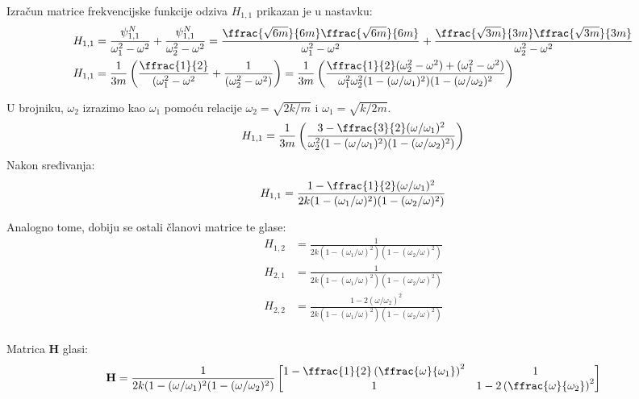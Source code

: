 Izračun matrice frekvencijske funkcije odziva $H_{1,1}$ prikazan je u nastavku:
\[
\begin{aligned}
    H_{1,1} &=
    \frac{\psi^N_{1,1}}{\omega_1^2-\omega^2}+\frac{\psi^N_{1,1}}{\omega_2^2-\omega^2}
    =
    \frac{\ffrac{\sqrt{6m}}{6m}\ffrac{\sqrt{6m}}{6m}}{\omega_1^2-\omega^2}
    +
    \frac{\ffrac{\sqrt{3m}}{3m}\ffrac{\sqrt{3m}}{3m}}{\omega_2^2-\omega^2}\\
    H_{1,1} &=
    \frac{1}{3m} 
        \left(
            \frac{\ffrac{1}{2}}{(\omega_1^2-\omega^2}
            +
            \frac{1}{(\omega_2^2-\omega^2)}
        \right)
    =
    \frac{1}{3m}
        \left(
            \frac{\ffrac{1}{2}(\omega_2^2-\omega^2)+(\omega_1^2-\omega^2)}
                {\omega_1^2\omega_2^2(1-(\omega/\omega_1)^2)(1-(\omega/\omega_2)^2}
        \right)\\
\end{aligned}
\]

U brojniku, $\omega_2$ izrazimo kao $\omega_1$ pomoću relacije $\omega_2=\sqrt{2k/m}$
i $\omega_1=\sqrt{k/2m}$.
\[
    \begin{aligned}
        H_{1,1}=
        \frac{1}{3m}
            \left(
                \frac{3-\ffrac{3}{2}(\omega/\omega_1)^2}
                    {\omega_2^2(1-(\omega/\omega_1)^2)(1-(\omega/\omega_2)^2)}
            \right)
    \end{aligned}
\]
Nakon sređivanja:
\begin{equation}\label{eq:frf_11}
    H_{1,1}=\frac{1-\ffrac{1}{2}(\omega/\omega_1)^2}{2k(1-(\omega_1/\omega)^2)(1-(\omega_2/\omega)^2)}
\end{equation}

Analogno tome, dobiju se ostali članovi matrice te glase:
\begin{align}
    H_{1,2} &= \frac{1}{2k(1-(\omega_1/\omega)^2)(1-(\omega_2/\omega)^2)}\label{eq:frf_12}\\
    H_{2,1} &= \frac{1}{2k(1-(\omega_1/\omega)^2)(1-(\omega_2/\omega)^2)}\label{eq:frf_21}\\
    H_{2,2} &= \frac{1-2(\omega/\omega_2)^2}{2k(1-(\omega_1/\omega)^2)(1-(\omega_2/\omega)^2)}\label{eq:frf_22}\\
\end{align}

Matrica $\mathbf{H}$ glasi:
\begin{equation}\label{eq:matrica_frf}
    \mathbf{H}=\frac{1}{2k(1-(\omega/\omega_1)^2(1-(\omega/\omega_2)^2)}
    \begin{bmatrix}
        1-\ffrac{1}{2}\left(\ffrac{\omega}{\omega_1}\right)^2 & 1 \\
        1 & 1-2\left(\ffrac{\omega}{\omega_2}\right)^2
    \end{bmatrix}
\end{equation}

